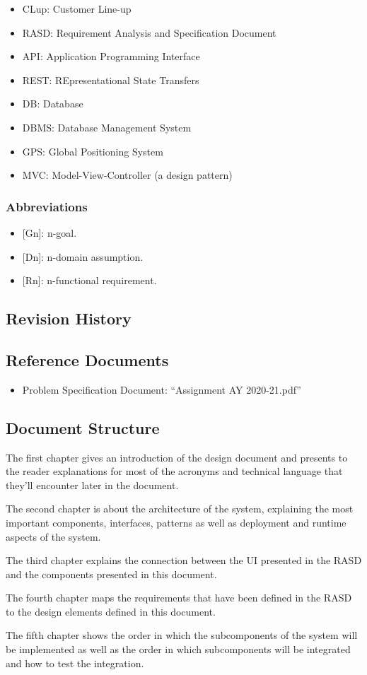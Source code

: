 \begin{itemize}
    \item CLup: Customer Line-up
    \item RASD: Requirement Analysis and Specification Document
    \item API: Application Programming Interface
    \item REST: REpresentational State Transfers
    \item DB: Database
    \item DBMS: Database Management System
    \item GPS: Global Positioning System
    \item MVC: Model-View-Controller (a design pattern)
\end{itemize}


\subsubsection{Abbreviations}

\begin{itemize}
    \item {[Gn]}: n-goal.
    \item {[Dn]}: n-domain assumption.
    \item {[Rn]}: n-functional requirement.
\end{itemize}

\subsection{Revision History}

\subsection{Reference Documents}

\begin{itemize}
    \item Problem Specification Document: ``Assignment AY 2020-21.pdf''
\end{itemize}

\subsection{Document Structure}

The first chapter gives an introduction of the design document and presents to the reader explanations for most of the acronyms and technical language that they'll encounter later in the document.

The second chapter is about the architecture of the system, explaining the most important components, interfaces, patterns as well as deployment and runtime aspects of the system.

The third chapter explains the connection between the UI presented in the RASD and the components presented in this document.

The fourth chapter maps the requirements that have been defined in the RASD to the design elements defined in this document.

The fifth chapter shows the order in which the subcomponents of the system will be implemented as well as the order in which subcomponents will be integrated and how to test the integration. 
